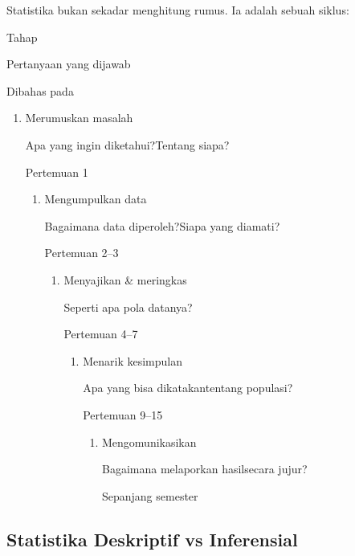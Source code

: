 \documentclass[
  indonesian,
  letterpaper,
]{book}
\providecommand{\tightlist}{%
  \setlength{\itemsep}{0pt}\setlength{\parskip}{0pt}}
\begin{document}
Statistika bukan sekadar menghitung rumus. Ia adalah sebuah siklus:

Tahap

Pertanyaan yang dijawab

Dibahas pada

\begin{enumerate}
\def\labelenumi{\arabic{enumi}.}
\tightlist
\item
  Merumuskan masalah

  Apa yang ingin diketahui?Tentang siapa?

  Pertemuan 1

  \begin{enumerate}
  \def\labelenumii{\arabic{enumii}.}
  \setcounter{enumii}{1}
  \tightlist
  \item
    Mengumpulkan data

    Bagaimana data diperoleh?Siapa yang diamati?

    Pertemuan 2--3

    \begin{enumerate}
    \def\labelenumiii{\arabic{enumiii}.}
    \setcounter{enumiii}{2}
    \tightlist
    \item
      Menyajikan \& meringkas

      Seperti apa pola datanya?

      Pertemuan 4--7

      \begin{enumerate}
      \def\labelenumiv{\arabic{enumiv}.}
      \setcounter{enumiv}{3}
      \tightlist
      \item
        Menarik kesimpulan

        Apa yang bisa dikatakantentang populasi?

        Pertemuan 9--15

        \begin{enumerate}
        \def\labelenumv{\arabic{enumv}.}
        \tightlist
        \item
          Mengomunikasikan

          Bagaimana melaporkan hasilsecara jujur?

          Sepanjang semester
        \end{enumerate}
      \end{enumerate}
    \end{enumerate}
  \end{enumerate}
\end{enumerate}

\subsection{Statistika Deskriptif vs
Inferensial}\label{statistika-deskriptif-vs-inferensial}
\end{document}
